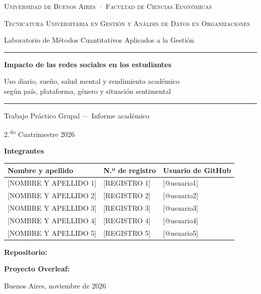 \begin{titlepage}
\thispagestyle{empty}
\centering
{\scshape Universidad de Buenos Aires · Facultad de Ciencias Económicas\par}
\vspace{0.15cm}
{\scshape\small Tecnicatura Universitaria en Gestión y Análisis de Datos en Organizaciones\par}
\vspace{0.15cm}
{\small Laboratorio de Métodos Cuantitativos Aplicados a la Gestión\par}

\vspace{2.6cm}
\rule{\linewidth}{0.6pt}\par
\vspace{0.5cm}
{\LARGE\bfseries Impacto de las redes sociales en los estudiantes\par}
\vspace{0.35cm}
{\large Uso diario, sueño, salud mental y rendimiento académico\\
según país, plataforma, género y situación sentimental\par}
\vspace{0.4cm}
\rule{\linewidth}{0.6pt}\par

\vspace{0.6cm}
{\large Trabajo Práctico Grupal — Informe académico\par}
\vspace{0.2cm}
{\normalsize 2.\textsuperscript{do} Cuatrimestre 2026\par}

\vspace{2.0cm}
{\bfseries Integrantes\par}
\vspace{0.3cm}
\renewcommand{\arraystretch}{1.35}
\begin{tabular}{l l l}
\toprule
\textbf{Nombre y apellido} & \textbf{N.º de registro} & \textbf{Usuario de GitHub} \\
\midrule
{[NOMBRE Y APELLIDO 1]} & {[REGISTRO 1]} & {[@usuario1]} \\
{[NOMBRE Y APELLIDO 2]} & {[REGISTRO 2]} & {[@usuario2]} \\
{[NOMBRE Y APELLIDO 3]} & {[REGISTRO 3]} & {[@usuario3]} \\
{[NOMBRE Y APELLIDO 4]} & {[REGISTRO 4]} & {[@usuario4]} \\
{[NOMBRE Y APELLIDO 5]} & {[REGISTRO 5]} & {[@usuario5]} \\
\bottomrule
\end{tabular}

\vfill
{\small\textbf{Repositorio:} \repositorio\par}
\vspace{0.1cm}
{\small\textbf{Proyecto Overleaf:} \overleaf\par}
\vspace{0.4cm}
{\small Buenos Aires, noviembre de 2026\par}
\end{titlepage}
\setcounter{page}{1}
